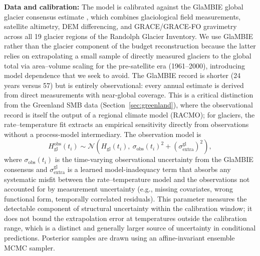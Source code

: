 \documentclass[11pt]{article}
\begin{document}
\textbf{Data and calibration:} The model is calibrated against the GlaMBIE global glacier consensus estimate \citep[2000--2023;][]{GlaMBIE2024}, which combines glaciological field measurements, satellite altimetry, DEM differencing, and GRACE/GRACE-FO gravimetry across all 19 glacier regions of the Randolph Glacier Inventory. We use GlaMBIE rather than the glacier component of the \citet{Frederikse2020} budget reconstruction because the latter relies on extrapolating a small sample of directly measured glaciers to the global total via area--volume scaling for the pre-satellite era (1961--2000), introducing model dependence that we seek to avoid. The GlaMBIE record is shorter (24 years versus 57) but is entirely observational: every annual estimate is derived from direct measurements with near-global coverage. This is a critical distinction from the Greenland SMB data (Section~\ref{sec:greenland}), where the observational record is itself the output of a regional climate model (RACMO); for glaciers, the rate--temperature fit extracts an empirical sensitivity directly from observations without a process-model intermediary. The observation model is
\begin{equation}
	H_{\mathrm{gl}}^{\mathrm{obs}}(t_i) \sim \mathcal{N}\!\left(H_{\mathrm{gl}}(t_i),\ \sigma_{\mathrm{obs}}(t_i)^2 + \left(\sigma_{\mathrm{extra}}^{\mathrm{gl}}\right)^2\right),
	\label{eq:glacier_likelihood}
\end{equation}
where $\sigma_{\mathrm{obs}}(t_i)$ is the time-varying observational uncertainty from the GlaMBIE consensus and $\sigma_{\mathrm{extra}}^{\mathrm{gl}}$ is a learned model-inadequacy term that absorbs any systematic misfit between the rate--temperature model and the observations not accounted for by measurement uncertainty (e.g., missing covariates, wrong functional form, temporally correlated residuals). This parameter measures the detectable component of structural uncertainty within the calibration window; it does not bound the extrapolation error at temperatures outside the calibration range, which is a distinct and generally larger source of uncertainty in conditional predictions. Posterior samples are drawn using an affine-invariant ensemble MCMC sampler.
\end{document}
